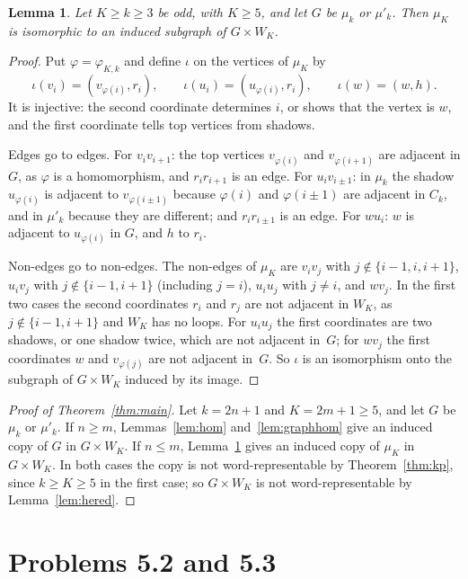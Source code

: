 \documentclass[11pt]{article}
\newtheorem{lemma}{Lemma}[section]
\theoremstyle{remark}
\begin{document}
\begin{lemma}\label{lem:emb}
Let $K\ge k\ge3$ be odd, with $K\ge5$, and let $G$ be $\mu_k$ or $\mu'_k$.
Then $\mu_K$ is isomorphic to an induced subgraph of $G\times W_K$.
\end{lemma}
\begin{proof}
Put $\varphi=\varphi_{K,k}$ and define $\iota$ on the vertices of $\mu_K$ by
\[
 \iota(v_i)=(v_{\varphi(i)},r_i),\qquad \iota(u_i)=(u_{\varphi(i)},r_i),\qquad
 \iota(w)=(w,h).
\]
It is injective: the second coordinate determines $i$, or shows that the
vertex is $w$, and the first coordinate tells top vertices from shadows.

Edges go to edges. For $v_iv_{i+1}$: the top vertices $v_{\varphi(i)}$ and
$v_{\varphi(i+1)}$ are adjacent in $G$, as $\varphi$ is a homomorphism, and
$r_ir_{i+1}$ is an edge. For $u_iv_{i\pm1}$: in $\mu_k$ the shadow
$u_{\varphi(i)}$ is adjacent to $v_{\varphi(i\pm1)}$ because $\varphi(i)$ and
$\varphi(i\pm1)$ are adjacent in $C_k$, and in $\mu'_k$ because they are
different; and $r_ir_{i\pm1}$ is an edge. For $wu_i$: $w$ is adjacent to
$u_{\varphi(i)}$ in $G$, and $h$ to $r_i$.

Non-edges go to non-edges. The non-edges of $\mu_K$ are $v_iv_j$ with
$j\notin\{i-1,i,i+1\}$, $u_iv_j$ with $j\notin\{i-1,i+1\}$ (including
$j=i$), $u_iu_j$ with $j\ne i$, and $wv_j$. In the first two cases the
second coordinates $r_i$ and $r_j$ are not adjacent in $W_K$, as
$j\notin\{i-1,i+1\}$ and $W_K$ has no loops. For $u_iu_j$ the first
coordinates are two shadows, or one shadow twice, which are not adjacent
in~$G$; for $wv_j$ the first coordinates $w$ and $v_{\varphi(j)}$ are not
adjacent in~$G$. So $\iota$ is an isomorphism onto the subgraph of
$G\times W_K$ induced by its image.
\end{proof}

\begin{proof}[Proof of Theorem~\ref{thm:main}]
Let $k=2n+1$ and $K=2m+1\ge5$, and let $G$ be $\mu_k$ or $\mu'_k$. If $n\ge m$,
Lemmas~\ref{lem:hom} and~\ref{lem:graphhom} give an induced copy of $G$ in
$G\times W_K$. If $n\le m$, Lemma~\ref{lem:emb} gives an induced copy of
$\mu_K$ in $G\times W_K$. In both cases the copy is not word-representable by
Theorem~\ref{thm:kp}, since $k\ge K\ge5$ in the first case; so $G\times W_K$
is not word-representable by Lemma~\ref{lem:hered}.
\end{proof}

\section{Problems 5.2 and 5.3}\label{sec:two}
\end{document}
